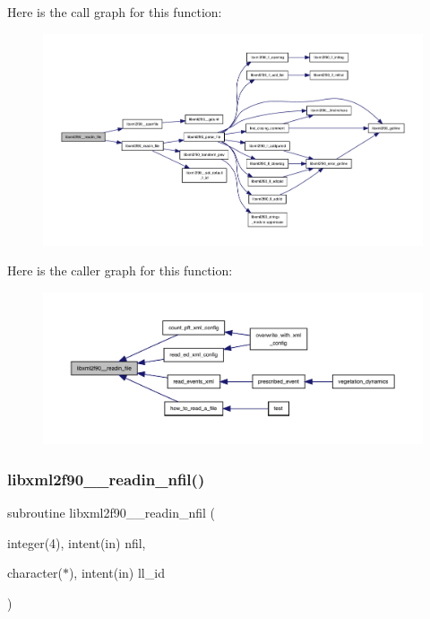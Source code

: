 Here is the call graph for this function\+:
\nopagebreak
\begin{figure}[H]
\begin{center}
\leavevmode
\includegraphics[width=350pt]{libxml2f90_8f90__pp_8f90_a9bbaec04b4014748bfea3b37b0a13f4a_cgraph}
\end{center}
\end{figure}
Here is the caller graph for this function\+:
\nopagebreak
\begin{figure}[H]
\begin{center}
\leavevmode
\includegraphics[width=350pt]{libxml2f90_8f90__pp_8f90_a9bbaec04b4014748bfea3b37b0a13f4a_icgraph}
\end{center}
\end{figure}
\mbox{\label{libxml2f90_8f90__pp_8f90_affef5dd7f09b41951ccedbf9e0c48bc0}} 
\subsubsection{\texorpdfstring{libxml2f90\+\_\+\+\_\+readin\+\_\+nfil()}{libxml2f90\_\_readin\_nfil()}}
{\footnotesize\ttfamily subroutine libxml2f90\+\_\+\+\_\+readin\+\_\+nfil (\begin{DoxyParamCaption}\item[{integer(4), intent(in)}]{nfil,  }\item[{character($\ast$), intent(in)}]{ll\+\_\+id }\end{DoxyParamCaption})}

